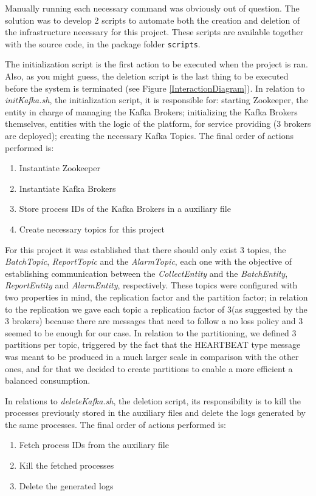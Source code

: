 \documentclass[12pt]{article}
\begin{document}
Manually running each necessary command was obviously out of question.
The solution was to develop 2 scripts to automate both the creation and deletion of the infrastructure necessary for this project. 
These scripts are available together with the source code, in the package folder \texttt{scripts}.

The initialization script is the first action to be executed when the project is ran.
Also, as you might guess, the deletion script is the last thing to be executed before the system is terminated (see Figure \ref{InteractionDiagram}).
In relation to \textit{initKafka.sh}, the initialization script, it is responsible for: starting Zookeeper, the entity in charge of managing the Kafka Brokers;
initializing the Kafka Brokers themselves, entities with the logic of the platform, for service providing (3 brokers are deployed); creating the necessary Kafka Topics.
The final order of actions performed is:
\vspace{-10pt}
\begin{enumerate} [noitemsep]
  \item Instantiate Zookeeper
  \item Instantiate Kafka Brokers
  \item Store process IDs of the Kafka Brokers in a auxiliary file
  \item Create necessary topics for this project
\end{enumerate}
\vspace{-10pt}
For this project it was established that there should only exist 3 topics, the \textit{BatchTopic}, \textit{ReportTopic} and the \textit{AlarmTopic}, each one with the objective of establishing communication between the \textit{CollectEntity} and the \textit{BatchEntity}, \textit{ReportEntity} and \textit{AlarmEntity}, respectively. These topics were configured with two properties in mind, the replication factor and the partition factor; in relation to the replication we gave each topic a replication factor of 3(as suggested by the 3 brokers) because there are messages that need to follow a no loss policy and 3 seemed to be enough for our case. In relation to the partitioning, we defined 3 partitions per topic, triggered by the fact that the HEARTBEAT type message was meant to be produced in a much larger scale in comparison with the other ones, and for that we decided to create partitions to enable a more efficient a balanced consumption.

In relations to \textit{deleteKafka.sh}, the deletion script, its responsibility is to kill the processes previously stored in the auxiliary files and delete 
the logs generated by the same processes.
The final order of actions performed is:
\vspace{-10pt}
\begin{enumerate} [noitemsep]
  \item Fetch process IDs from the auxiliary file
  \item Kill the fetched processes
  \item Delete the generated logs
\end{enumerate}
\vspace{-10pt}
\end{document}

